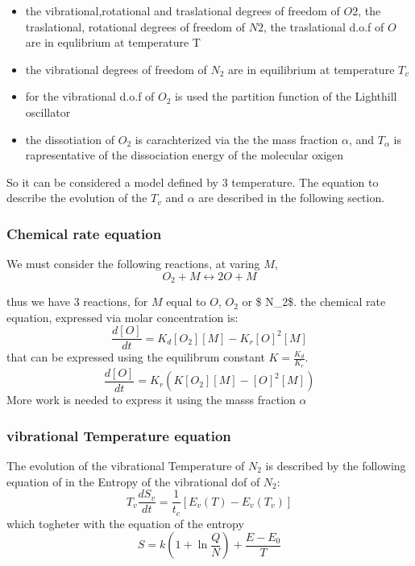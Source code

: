 \documentclass[
]{article}
\providecommand{\tightlist}{%
  \setlength{\itemsep}{0pt}\setlength{\parskip}{0pt}}
\begin{document}
\begin{itemize}
\tightlist
\item
  the vibrational,rotational and traslational degrees of freedom of
  \(O2\), the traslational, rotational degrees of freedom of \(N2\), the
  traslational d.o.f of \(O\) are in equlibrium at temperature T
\item
  the vibrational degrees of freedom of \(N_2\) are in equilibrium at
  temperature \(T_v\)
\item
  for the vibrational d.o.f of \(O_2\) is used the partition function of
  the Lighthill oscillator
\item
  the dissotiation of \(O_2\) is carachterized via the the mass fraction
  \(\alpha\), and \(T_\alpha\) is rapresentative of the dissociation
  energy of the molecular oxigen
\end{itemize}

So it can be considered a model defined by 3 temperature. The equation
to describe the evolution of the \(T_v\) and \(\alpha\) are described in
the following section.

\hypertarget{chemical-rate-equation}{%
\subsubsection{Chemical rate equation}\label{chemical-rate-equation}}

We must consider the following reactions, at varing \(M\), \[
O_2 + M  \leftrightarrow 2O + M
\]

thus we have 3 reactions, for \(M\) equal to \(O\), \(O_2\) or \$
N\_2\$. the chemical rate equation, expressed via molar concentration
is: \[
\frac{d[O]}{dt}=K_d[O_2][M] - K_r[O]^2[M]
\] that can be expressed using the equilibrum constant
\(K=\frac{K_d}{K_r}\). \[
\frac{d[O]}{dt}=K_r(K[O_2][M] - [O]^2[M])
\] More work is needed to express it using the masss fraction \(\alpha\)

\hypertarget{vibrational-temperature-equation}{%
\subsubsection{vibrational Temperature
equation}\label{vibrational-temperature-equation}}

The evolution of the vibrational Temperature of \(N_2\) is described by
the following equation of in the Entropy of the vibrational dof of
\(N_2\): \[
T_v\frac{dS_v}{dt}=\frac{1}{t_c} [E_v(T) - E_v(T_v)]
\] which togheter with the equation of the entropy \[
S=k(1 +\ln\frac Q N )+ \frac{E-E_0}{T}
\]
\end{document}
